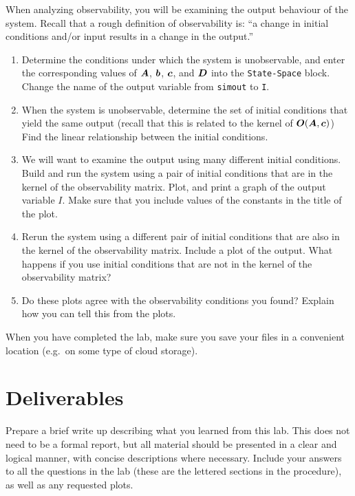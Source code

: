 \begin{enumerate}
          When analyzing observability, you will be examining the output behaviour of
          the system.  Recall that a rough definition of observability is: ``a change
          in initial conditions and/or input results in a change in the output.''
          \begin{enumerate}
              \item Determine the conditions under which the system is unobservable, and enter the corresponding values of \(\boldsymbol{A}\),
                    \(\boldsymbol{b}\), \(\boldsymbol{c}\), and \(\boldsymbol{D}\) into the \verb|State-Space| block.
                    Change the name of the output variable from \verb|simout| to \verb|I|.
              \item When the system is unobservable, determine the set of initial
                    conditions that yield the same output (recall that this is related to the kernel of \( \boldsymbol{O}(\boldsymbol{A},\boldsymbol{c}) \)) Find the linear relationship between
                    the initial conditions.
              \item We will want to examine the output using many different initial
                    conditions.  Build and run the system using a pair of initial conditions that
                    are in the kernel of the observability matrix.  Plot, and print a graph of
                    the output variable \(I\).  Make sure that you include values of the constants
                    in the title of the plot.
              \item Rerun the system using a different pair of initial conditions that are
                    also in the kernel of the observability matrix.  Include a plot of the
                    output. What happens if you use initial conditions that are not in the kernel
                    of the observability matrix?

              \item Do these plots agree with the observability conditions you found? Explain how you can tell this from the plots.
          \end{enumerate}

\end{enumerate}

When you have completed the lab, make sure you save your files in a convenient location (e.g.\ on some type of cloud storage).

\section{Deliverables}
Prepare a brief write up describing what you learned from this lab. This does not need to be a formal report, but all material should be presented in a clear and logical manner, with concise descriptions where necessary. Include your answers to all the questions in the lab (these are the lettered sections in the procedure), as well as any requested plots.

